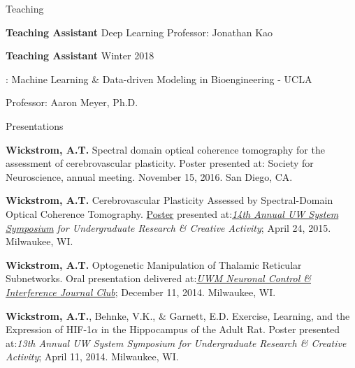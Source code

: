 \documentclass[10pt, oneside]{article}
\begin{document}
\newpage
%
%
%
%
%
%
%
\begin{cvlist}{Teaching}
    \item \textbf{Teaching Assistant}
    Deep Learning
    Professor: Jonathan Kao
    \item \textbf{Teaching Assistant}  \hfill Winter 2018
    \item \color{blue} %
    \href{https://aarmey.github.io/ml-for-bioe/}{\underline{}}:
    \color{black} Machine Learning \& Data-driven Modeling in Bioengineering - UCLA
    
    Professor: Aaron Meyer, Ph.D.
\end{cvlist}
%
%
%
%
%
\vspace{-10mm}
\begin{cvlist}{Presentations}%
	\item \textbf{Wickstrom, A.T.} Spectral domain optical coherence tomography for the assessment of cerebrovascular plasticity.  Poster presented at: Society for Neuroscience, annual meeting. November 15, 2016. San Diego, CA.
	\item \textbf{Wickstrom, A.T.} Cerebrovascular Plasticity Assessed by Spectral-Domain Optical \newline Coherence Tomography.
		\color{blue}\href {https://sites.google.com/site/atwreferencesapril2015/}{Poster} \color{black}presented at:\hspace{2pt}\color{blue}\href{http://dc.uwm.edu/uwsurca/2015/Poster1/55/}{\textit{14th Annual UW System Symposium}}\newline
		\color{black}\textit{for Undergraduate Research \& Creative Activity}; April 24, 2015. Milwaukee, WI.
	\color{blue}
	
	\color{black}
	\item \textbf{Wickstrom, A.T.} Optogenetic Manipulation of Thalamic Reticular Subnetworks. \newline Oral presentation delivered at:\hspace{2pt}\color{blue}\href{https://sites.google.com/site/uwmnci/}			{\textit{UWM Neuronal Control \& Interference Journal Club}}\color{black}; December 11, 2014. Milwaukee, WI.
	\item \textbf{Wickstrom, A.T.}, Behnke, V.K., \& Garnett, E.D. Exercise, Learning, and the Expression of HIF-1$\alpha$ in the
		Hippocampus of the Adult Rat. 
		Poster presented at:\hspace{3pt}\textit{13th Annual UW System Symposium for Undergraduate Research \& Creative Activity}; 
		April 11, 2014. Milwaukee, WI.
	
\end{cvlist}
\vspace{-3mm}
\end{document}
